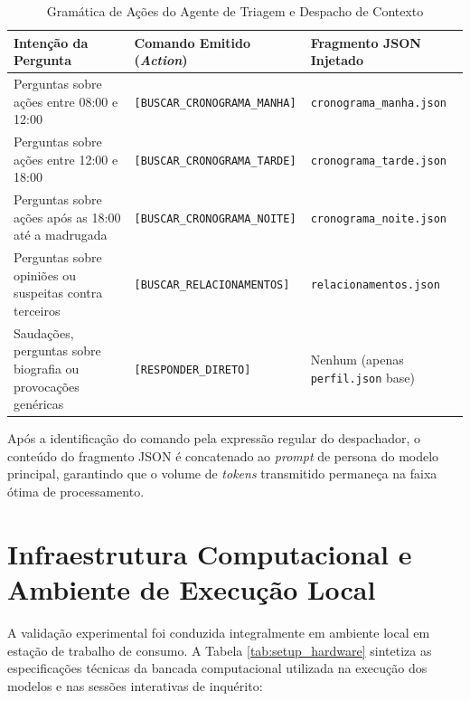 \begin{table}[htbp]
\centering
\caption{Gramática de Ações do Agente de Triagem e Despacho de Contexto}
\vspace{0.2cm}
\label{tab:comandos_triagem}
\footnotesize
\renewcommand{\arraystretch}{1.3}
\begin{tabularx}{\textwidth}{|>{\hsize=0.95\hsize}X|>{\hsize=1.15\hsize}X|>{\hsize=0.9\hsize}X|}
\hline
\textbf{Intenção da Pergunta} & \textbf{Comando Emitido (\textit{Action})} & \textbf{Fragmento JSON Injetado} \\ \hline
Perguntas sobre ações entre 08:00 e 12:00 & {\scriptsize\texttt{[BUSCAR\_CRONOGRAMA\_MANHA]}} & {\scriptsize\texttt{cronograma\_manha.json}} \\ \hline
Perguntas sobre ações entre 12:00 e 18:00 & {\scriptsize\texttt{[BUSCAR\_CRONOGRAMA\_TARDE]}} & {\scriptsize\texttt{cronograma\_tarde.json}} \\ \hline
Perguntas sobre ações após as 18:00 até a madrugada & {\scriptsize\texttt{[BUSCAR\_CRONOGRAMA\_NOITE]}} & {\scriptsize\texttt{cronograma\_noite.json}} \\ \hline
Perguntas sobre opiniões ou suspeitas contra terceiros & {\scriptsize\texttt{[BUSCAR\_RELACIONAMENTOS]}} & {\scriptsize\texttt{relacionamentos.json}} \\ \hline
Saudações, perguntas sobre biografia ou provocações genéricas & {\scriptsize\texttt{[RESPONDER\_DIRETO]}} & Nenhum (apenas \texttt{perfil.json} base) \\ \hline
\end{tabularx}
\end{table}

Após a identificação do comando pela expressão regular do despachador, o conteúdo do fragmento JSON é concatenado ao \textit{prompt} de persona do modelo principal, garantindo que o volume de \textit{tokens} transmitido permaneça na faixa ótima de processamento.

\section{Infraestrutura Computacional e Ambiente de Execução Local}
\label{sec:dev_hardware}

A validação experimental foi conduzida integralmente em ambiente local em estação de trabalho de consumo. A Tabela \ref{tab:setup_hardware} sintetiza as especificações técnicas da bancada computacional utilizada na execução dos modelos e nas sessões interativas de inquérito:

